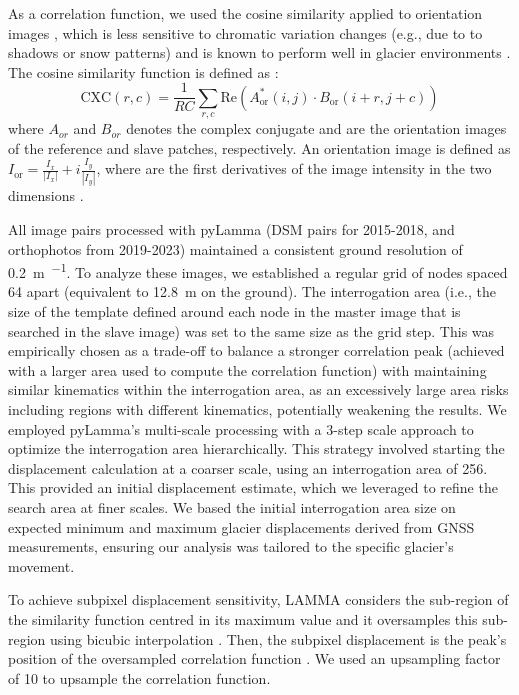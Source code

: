 As a correlation function, we used the cosine similarity applied to orientation images \citep{Dematteis2021}, 
which is less sensitive to chromatic variation changes (e.g., due to to shadows or snow patterns) and is known 
to perform well in glacier environments \citep{Heid2012_evaluation_xcorr, Dematteis2019}.
The cosine similarity function is defined as \citep{Dematteis2022}:
\begin{equation}
\text{CXC}(r,c) = \frac{1}{RC} \sum_{r,c} \mathrm{Re} \left( A_{\text{or}}^{*}(i,j) \cdot B_{\text{or}}(i+r,j+c) \right)
\end{equation}
where $A_{or}$ and $B_{or}$ denotes the complex conjugate and are the orientation images of the 
reference and slave patches, respectively. 
An orientation image is defined as $ I_{\text{or}} = \frac{I_x}{|I_x|} + i\frac{I_y}{|I_y|} $, 
where are the first derivatives of the image intensity in the two dimensions \citep{fitch2002_OC}.

All image pairs processed with pyLamma (DSM pairs for 2015-2018, and orthophotos from 2019-2023) maintained a 
consistent ground resolution of \SI{0.2}{\meter\per\pixel}. 
To analyze these images, we established a regular grid of nodes spaced \SI{64}{\pixel} apart (equivalent to \SI{12.8}{\meter} 
on the ground).
The interrogation area (i.e., the size of the template defined around each node in the master image that is searched in the slave image)
was set to the same size as the grid step.
This was empirically chosen as a trade-off to balance a stronger correlation peak (achieved with a larger area used to 
compute the correlation function) with maintaining similar kinematics within the interrogation area, as an excessively 
large area risks including regions with different kinematics, potentially weakening the results. 
We employed pyLamma's multi-scale processing with a 3-step scale approach to optimize the interrogation area hierarchically.  
This strategy involved starting the displacement calculation at a coarser scale, using an interrogation area of \SI{256}{\pixel}. 
This provided an initial displacement estimate, which we leveraged to refine the search area at finer scales.  
We based the initial interrogation area size on expected minimum and maximum glacier displacements derived from GNSS measurements, 
ensuring our analysis was tailored to the specific glacier's movement.

To achieve subpixel displacement sensitivity, LAMMA considers the sub-region of the similarity function centred 
in its maximum value and it oversamples this sub-region using bicubic interpolation \citep{Dematteis2022}.
Then, the subpixel displacement is the peak's position of the oversampled correlation function \citep{Debella_Gilo2011}.
We used an upsampling factor of 10 to upsample the correlation function. 


